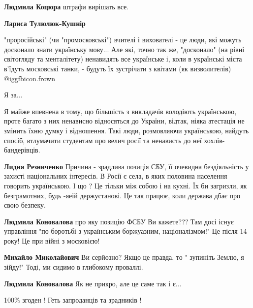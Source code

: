 \begin{itemize}
\begin{itemize}
\begin{itemize}
\textbf{Людмила Коцюра} штрафи вирішать все.
\end{itemize} %

\textbf{Лариса Тулюлюк-Кушнір} 

"проросійські" (чи "промосковські") вчителі і
вихователі - це люди, які можуть досконало знати українську мову... Але які,
точно так же, "досконало" (на рівні світогляду та менталітету) ненавидять все
українське і, коли в українські міста в'їдуть московські танки, - будуть їх
зустрічати з квітами (як визволителів)  @igg{fbicon.frown} 

\end{itemize} %

Я за...


Я майже впевнена в тому, що більшість з викладачів володіють українською, проте
багато з них ненависно відносяться до України, відтак, ніяка атестація не
змінить їхню думку і відношення. Такі люди, розмовляючи українською, найдуть
спосіб, втлумачити студентам про велич росії та ненависть до неї
хохлів-бандерівців.

\begin{itemize} %
\textbf{Лидия Резниченко} Причина - зрадлива позиція СБУ, її очевидна
бездіяльність у захисті національних інтересів. В Росії є села, в яких половина
населення говорить українською. І що ? Це тільки між собою і на кухні. Їх би
загризли, як безграмотних, будь -яеій держустанові. Це так працює, коли держава
дбає про свою безпеку.

\begin{itemize} %
\textbf{Людмила Коновалова} про яку позицію ФСБУ Ви кажете??? Там досі існує управління "по боротьбі з українським-боржуазним, націоналізмом!" Це після 14 року! Це при війні з московією!

\textbf{Михайло Миколайович} Ви серйозно? Якщо це правда, то " зупиніть Землю, я зійду!" Тоді, ми сидимо в глибокому проваллі.

\textbf{Людмила Коновалова} Як не прикро, але це саме так і є...
\end{itemize} %

\end{itemize} %

100\% згоден ! Геть запроданців та зрадників !


\end{itemize}
